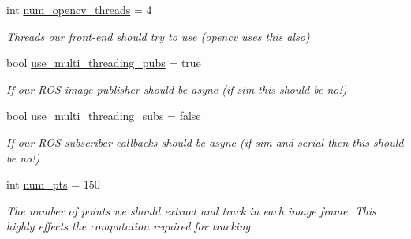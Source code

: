 \begin{DoxyCompactItemize}
\mbox{\label{structov__msckf_1_1VioManagerOptions_ac68cc4f6f0e072ba2a06ada8e68b22bc}} 
int \hyperlink{structov__msckf_1_1VioManagerOptions_ac68cc4f6f0e072ba2a06ada8e68b22bc}{num\+\_\+opencv\+\_\+threads} = 4
\begin{DoxyCompactList}\small\item\em Threads our front-\/end should try to use (opencv uses this also) \end{DoxyCompactList}\item 
\mbox{\label{structov__msckf_1_1VioManagerOptions_afaadd730413dd254d8f53da5a7ba5f17}} 
bool \hyperlink{structov__msckf_1_1VioManagerOptions_afaadd730413dd254d8f53da5a7ba5f17}{use\+\_\+multi\+\_\+threading\+\_\+pubs} = true
\begin{DoxyCompactList}\small\item\em If our R\+OS image publisher should be async (if sim this should be no!) \end{DoxyCompactList}\item 
\mbox{\label{structov__msckf_1_1VioManagerOptions_a63e5226f519e51f29210e3d29f757eba}} 
bool \hyperlink{structov__msckf_1_1VioManagerOptions_a63e5226f519e51f29210e3d29f757eba}{use\+\_\+multi\+\_\+threading\+\_\+subs} = false
\begin{DoxyCompactList}\small\item\em If our R\+OS subscriber callbacks should be async (if sim and serial then this should be no!) \end{DoxyCompactList}\item 
\mbox{\label{structov__msckf_1_1VioManagerOptions_a1bde650ec917e7a3df221a1524e33429}} 
int \hyperlink{structov__msckf_1_1VioManagerOptions_a1bde650ec917e7a3df221a1524e33429}{num\+\_\+pts} = 150
\begin{DoxyCompactList}\small\item\em The number of points we should extract and track in {\itshape each} image frame. This highly effects the computation required for tracking. \end{DoxyCompactList}\item 
\mbox{\label{structov__msckf_1_1VioManagerOptions_a27d862f8f1811211f895b27a3b789e3a}} 

\end{DoxyCompactItemize}
